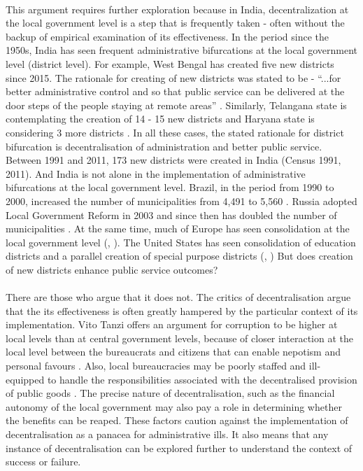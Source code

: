 \documentclass[12pt, a4paper]{article}
\begin{document}
\paragraph{} This argument requires further exploration because in India, decentralization at the local government level is a step that is frequently taken - often without the backup of empirical examination of its effectiveness. In the period since the 1950s, India has seen frequent administrative bifurcations at the local government level (district level). For example, West Bengal has created five new districts since 2015. The rationale for creating of new districts was stated to be - ``...for better administrative control and so that public service can be delivered at the door steps of the people staying at remote areas'' \parencite{Mamata}. Similarly, Telangana state is contemplating the creation of 14 - 15 new districts \parencite{Telengana} and Haryana state is considering 3 more districts \parencite{Haryana}. In all these cases, the stated rationale for district bifurcation is decentralisation of administration and better public service. Between 1991 and 2011, 173 new districts were created in India (Census 1991, 2011). And India is not alone in the implementation of administrative bifurcations at the local government level. Brazil, in the period from 1990 to 2000, increased the number of municipalities from 4,491 to 5,560 \parencite{tomio2005creation}. Russia adopted Local Government Reform in 2003 and since then has doubled the number of municipalities \parencite{turgel2008new}. At the same time, much of Europe has seen consolidation at the local government level (\cite{mouritzen_danish_2010}, \cite{bikker_scale_2016}). The United States has seen consolidation of education districts and a parallel creation of special purpose districts (\cite{strang1987administrative}, \cite{mccabe2000special}) But does creation of new districts enhance public service outcomes?
\paragraph{}There are those who argue that it does not. The critics of decentralisation argue that the its effectiveness is often greatly hampered by the particular context of its implementation. Vito Tanzi offers an argument for corruption to be higher at local levels than at central government levels, because of closer interaction at the local level between the bureaucrats and citizens that can enable nepotism and personal favours \parencite{tanzi1996macroeconomic}. Also, local bureaucracies may be poorly staffed and ill-equipped to handle the responsibilities associated with the decentralised provision of public goods \parencite{prud1995dangers}. The precise nature of decentralisation, such as the financial autonomy of the local government may also pay a role in determining whether the benefits can be reaped. These factors caution against the implementation of decentralisation as a panacea for administrative ills. It also means that any instance of decentralisation can be explored further to understand the context of success or failure.
\end{document}
